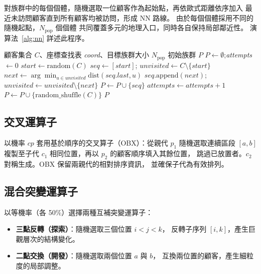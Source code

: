 \documentclass[11pt, a4paper]{article}
\numberwithin{equation}{section}
\begin{document}
對族群中的每個個體，隨機選取一位顧客作為起始點，再依歐式距離依序加入
最近未訪問顧客直到所有顧客均被訪問，形成 NN 路線。
由於每個個體採用不同的隨機起點，$N_{\mathrm{pop}}$ 個個體
共同覆蓋多元的地理入口，同時各自保持局部鄰近性。
演算法~\ref{alg:nn} 詳述此程序。

\begin{algorithm}[ht]
\caption{單一族群的 NN 初始化}
\label{alg:nn}
\begin{algorithmic}[1]
\Require 顧客集合 $C$、座標查找表 \textit{coord}、目標族群大小 $N_{\mathrm{pop}}$
\Ensure 初始族群 $P$
\State $P \leftarrow \emptyset$;\quad \textit{attempts} $\leftarrow 0$
  \State $\textit{start} \leftarrow \mathrm{random}(C)$
  \State $\textit{seq} \leftarrow [\textit{start}]$;\quad
         $\textit{unvisited} \leftarrow C \setminus \{\textit{start}\}$
    \State $\textit{next} \leftarrow
           \arg\min_{u\in\textit{unvisited}}\mathrm{dist}(\textit{seq.last},u)$
    \State $\textit{seq}.\mathrm{append}(\textit{next})$;\quad
           $\textit{unvisited} \leftarrow \textit{unvisited}\setminus
           \{\textit{next}\}$
  \EndWhile
    \State $P \leftarrow P \cup \{\textit{seq}\}$
  \EndIf
  \State $\textit{attempts} \leftarrow \textit{attempts}+1$
\EndWhile
{}
  \State $P \leftarrow P \cup \{\mathrm{random\_shuffle}(C)\}$
\EndWhile
\State \Return $P$
\end{algorithmic}
\end{algorithm}

\subsection{交叉運算子}

以機率 $cp$ 套用基於順序的交叉算子（OBX）：從親代 $p_1$ 隨機選取連續區段
$[a,b]$ 複製至子代 $c_1$ 相同位置，再以 $p_2$ 的顧客順序填入其餘位置，
跳過已放置者。$c_2$ 對稱生成。OBX 保留兩親代的相對排序資訊，
並確保子代為有效排列。

\subsection{混合突變運算子}

以等機率（各 50\%）選擇兩種互補突變運算子：
\begin{itemize}
  \item \textbf{三點反轉（探索）}：隨機選取三個位置 $i<j<k$，
        反轉子序列 $[i,k]$，產生巨觀層次的結構變化。
  \item \textbf{二點交換（開發）}：隨機選取兩個位置 $a$ 與 $b$，
        互換兩位置的顧客，產生細粒度的局部調整。
\end{itemize}
\end{document}
